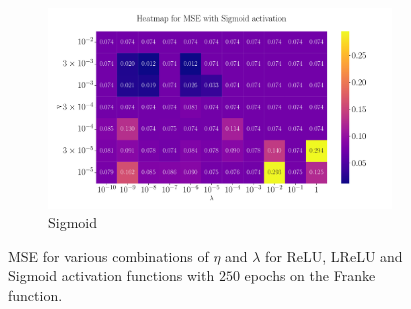 \documentclass[%
reprint,
amsmath,amssymb,
aps,
]{revtex4-2}
\begin{document}
\begin{figure}[ht!]
\begin{subfigure}{0.4353\textwidth}
		\includegraphics[width=\textwidth]{Python/Figures/Heatmap_MSE_Sigmoid_Franke_Epochs250.pdf}
		\caption{Sigmoid}
	\end{subfigure}
	\caption{MSE for various combinations of $\eta$ and $\lambda$ for ReLU, LReLU and Sigmoid activation functions with $250$ epochs on the Franke function.}
	\label{fig:FFNN_Franke_heatmaps}	
\end{figure}
\end{document}
